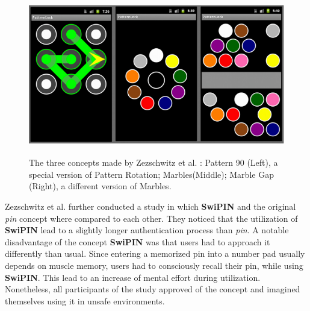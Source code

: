 \begin{figure}[t!]
\centering
\includegraphics[width=13cm, height=7cm]{Chapters/graphics/graphic.PNG}
\caption{The three concepts made by Zezschwitz et al. \cite{Marbles}: Pattern 90 (Left), a special version of Pattern Rotation; Marbles(Middle); Marble Gap (Right), a different version of Marbles.}
\label{fig:marbles}
\end{figure}

Zezschwitz et al. \cite{Swipin} further conducted a study in which \textbf{SwiPIN} and the original \textit{pin} concept where compared to each other. They noticed that the utilization of \textbf{SwiPIN} lead to a slightly longer authentication process than \textit{pin}. A notable disadvantage of the concept \textbf{SwiPIN} was that users had to approach it differently than usual. Since entering a memorized pin into a number pad usually depends on muscle memory, users had to consciously recall their pin, while using \textbf{SwiPIN}. This lead to an increase of mental effort during utilization. Nonetheless, all participants of the study approved of the concept and imagined themselves using it in unsafe environments. \\

